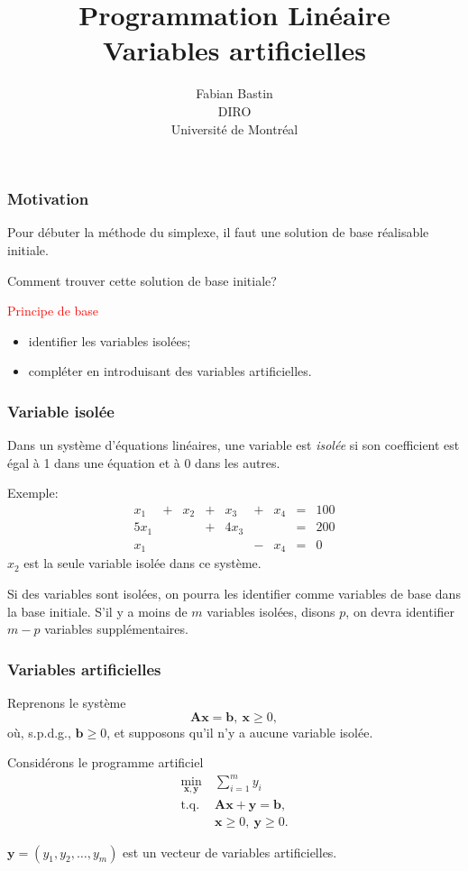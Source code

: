 \documentclass[usepdftitle=false]{beamer}
\title[Variables artificielles]{Programmation Linéaire\\Variables artificielles}
\author[Fabian Bastin]{Fabian Bastin\\DIRO\\Université de Montréal}
\date{}
\def\bb{\boldsymbol{b}}
\def\bx{\boldsymbol{x}}
\def\by{\boldsymbol{y}}
\def\bA{\boldsymbol{A}}
\begin{document}
\frame{\titlepage}


\begin{frame}
\frametitle{Motivation}

Pour débuter la méthode du simplexe, il faut une solution de base réalisable initiale.

\mbox{}

Comment trouver cette solution de base initiale?

\mbox{}

\textcolor{red}{Principe de base}
\begin{itemize}
	\item
	identifier les variables isolées;
	\item
compléter en introduisant des variables artificielles.
\end{itemize}

\end{frame}

\begin{frame}
\frametitle{Variable isolée}

Dans un système d'équations linéaires, une variable est {\em isolée} si son coefficient est égal à 1 dans une équation et à 0 dans les autres.

\mbox{}

Exemple:
$$
\begin{matrix}
x_1 & + & x_2 & + & x_3 & + &  x_4 & = & 100 \\
5x_1 & & & + & 4x_3 & & & = & 200 \\
x_1 & & & & & -  & x_4 & = & 0
\end{matrix}
$$
$x_2$ est la seule variable isolée dans ce système.

\mbox{}

Si des variables sont isolées, on pourra les identifier comme variables de base dans la base initiale. S'il y a moins de $m$ variables isolées, disons $p$, on devra identifier $m-p$ variables supplémentaires.
\end{frame}

\begin{frame}
\frametitle{Variables artificielles}

Reprenons le système
\[
\bA\bx = \bb, \ \bx \geq 0,
\]
où, s.p.d.g., $\bb \geq 0$, et supposons qu'il n'y a aucune variable isolée.

\mbox{}

Considérons le programme artificiel
\begin{align*}
\min_{\bx,\by} \ & \sum_{i = 1}^m y_i\\
\mbox{t.q. } & \bA\bx + \by = \bb,\\
& \bx \geq 0, \ \by \geq 0.
\end{align*}

$\by = (y_1, y_2,\ldots, y_m)$ est un vecteur de variables artificielles.

\end{frame}
\end{document}
